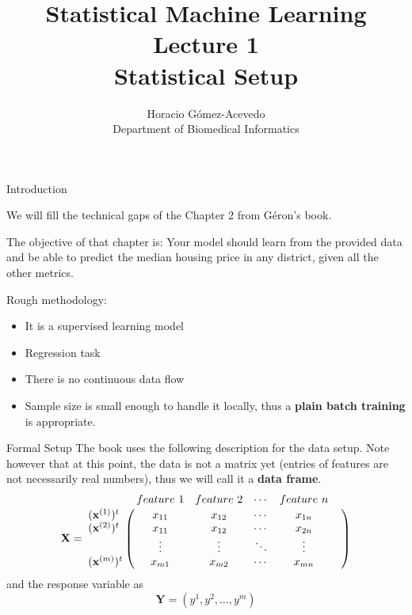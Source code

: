 \documentclass{beamer}
\title{Statistical Machine Learning\\ Lecture 1 \\ Statistical Setup}
\author{Horacio G\'omez-Acevedo\\ Department of Biomedical Informatics}
\begin{document}
\begin{frame}[plain]
    \maketitle
\end{frame}
\begin{frame}{Introduction}
	
	We will fill the technical gaps of the Chapter 2 from G\'eron's book. 
	
	The objective of that chapter is:  Your model should learn from the provided data and be able to predict the median housing price in any district, given all the other metrics. 
	
	Rough methodology:
	\begin{itemize}
		\item It is a supervised learning model 
		\item Regression task 
		\item There is no continuous data flow 
		\item Sample size is small enough to handle it locally, thus a {\bf plain batch training} is appropriate.
	\end{itemize}
	
\end{frame}

\begin{frame}{Formal Setup}
	The book uses the following description for the data setup. Note however that at this point, the data is not a matrix yet (entries of features are not necessarily real numbers), thus we will call it a {\bf data frame}.
\begin{equation*}
	\mathbf{X}=
\bordermatrix{~ & feature\ 1 & feature\ 2 & \cdots & feature\ n   \cr
	(\mathbf{x}^{(1)} )^t& x_{11} & x_{12} & \cdots & x_{1n}   \cr
	(\mathbf{x}^{(2)} )^t& x_{11} & x_{12} & \cdots & x_{2n}   \cr
			 & \vdots & \vdots & \ddots & \vdots &  \cr
	(\mathbf{x}^{(m)} )^t & x_{m1} & x_{m2} & \cdots & x_{mn}  \cr} 
	\end{equation*}
and the response variable as 
$$
\mathbf{Y}=  (y^1, y^2, \ldots , y^m)
$$


\end{frame}
\end{document}
